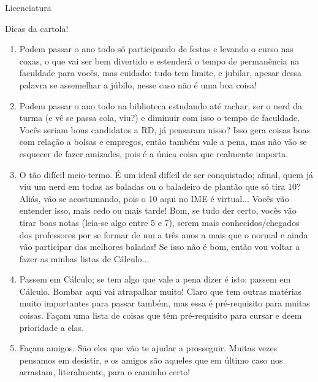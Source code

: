 \begin{subsecao}{Licenciatura}
\begin{subsubsecao}{Dicas da cartola!}
\begin{enumerate}
\item Podem passar o ano todo só participando de festas e levando o curso nas
  coxas, o que vai ser bem divertido e estenderá o tempo de permanência na
  faculdade para vocês, mas cuidado: tudo tem limite, e jubilar, apesar dessa
  palavra se assemelhar a júbilo, nesse caso não é uma boa coisa!
\item Podem passar o ano todo na biblioteca estudando até rachar, ser o nerd da
  turma (e vê se passa cola, viu?) e diminuir com isso o tempo de faculdade.
  Vocês seriam bons candidatos a RD, já pensaram nisso? Isso gera coisas boas
  com relação a bolsas e empregos, então também vale a pena, mas não vão se
  esquecer de fazer amizades, pois é a única coisa que realmente importa.
\item O tão difícil meio-termo. É um ideal difícil de ser conquistado; afinal,
  quem já viu um nerd em todas as baladas ou o baladeiro de plantão que só tira
  10? Aliás, vão se acostumando, pois o 10 aqui no IME é virtual... Vocês vão
  entender isso, mais cedo ou mais tarde! Bom, se tudo der certo, vocês vão
  tirar boas notas (leia-se algo entre 5 e 7), serem mais conhecidos/chegados
  dos professores por se formar de um a três anos a mais que o normal e ainda
  vão participar das melhores baladas! Se isso não é bom, então vou voltar a
  fazer as minhas listas de Cálculo...
\item Passem em Cálculo; se tem algo que vale a pena dizer é isto: passem em
  Cálculo. Bombar aqui vai atrapalhar muito! Claro que tem outras matérias muito
  importantes para passar também, mas essa é pré-requisito para muitas coisas.
  Façam uma lista de coisas que têm pré-requisito para cursar e deem prioridade
  a elas. 
\item Façam amigos. São eles que vão te ajudar a prosseguir. Muitas vezes
  pensamos em desistir, e os amigos são aqueles que em último caso nos arrastam,
  literalmente, para o caminho certo!

\end{enumerate}
\end{subsubsecao}

\end{subsecao}
